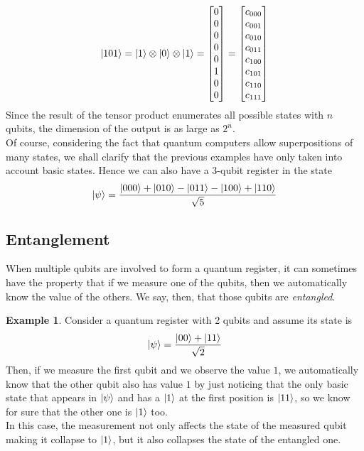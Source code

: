 \documentclass[12pt,a4paper]{report}
\theoremstyle{definition}
\theoremstyle{definition}
\newtheorem{example}{Example}[section]
\theoremstyle{definition}
\begin{document}
\begin{equation*}
    \ket{101}=\ket{1}\otimes\ket{0}\otimes\ket{1}=\begin{bmatrix}
        0\\
        0\\
        0\\
        0\\
        0\\
        1\\
        0\\
        0
    \end{bmatrix}=\begin{bmatrix}
        c_{000}\\
        c_{001}\\
        c_{010}\\
        c_{011}\\
        c_{100}\\
        c_{101}\\
        c_{110}\\
        c_{111}
    \end{bmatrix}
\end{equation*}
Since the result of the tensor product enumerates all possible states with $n$ qubits, the dimension of the output is as large as $2^n$.\\
Of course, considering the fact that quantum computers allow superpositions of many states, we shall clarify that the previous examples have only taken into account basic states. Hence we can also have a 3-qubit register in the state
\begin{equation*}
    \ket{\psi}=\frac{\ket{000}+\ket{010}-\ket{011}-\ket{100}+\ket{110}}{\sqrt{5}}
\end{equation*}



\subsection{Entanglement}
When multiple qubits are involved to form a quantum register, it can sometimes have the property that if we measure one of the qubits, then we automatically know the value of the others. We say, then, that those qubits are \textit{entangled}.
\begin{example}
Consider a quantum register with 2 qubits and assume its state is
\begin{equation*}
    \ket{\psi}=\frac{\ket{00}+\ket{11}}{\sqrt{2}}
\end{equation*}
Then, if we measure the first qubit and we observe the value $1$, we automatically know that the other qubit also has value $1$ by just noticing that the only basic state that appears in $\ket{\psi}$ and has a $\ket{1}$ at the first position is $\ket{11}$, so we know for sure that the other one is $\ket{1}$ too.\\
In this case, the measurement not only affects the state of the measured qubit making it collapse to $\ket{1}$, but it also collapses the state of the entangled one.
\end{example}
\end{document}
